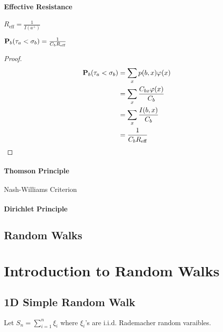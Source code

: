 \paragraph{Effective Resistance} 
\begin{definition}
    $R_{\text{eff}}=\frac{1}{I(a^+)}$
\end{definition}

\begin{theorem}
    $\mathbf{P}_b(\tau_a<\sigma_b)=\frac{1}{C_bR_{\text{eff}}}$
\end{theorem}
\begin{proof}
    \begin{align*}
        \mathbf{P}_b(\tau_a<\sigma_b)&=\sum_x p(b,x)\varphi(x)\\
        &=\sum_x \frac{C_{bx}\varphi(x)}{C_b}\\
        &=\sum_x \frac{I(b,x)}{C_b}\\
        &=\frac{1}{C_bR_{\text{eff}}}
    \end{align*}
\end{proof}

\paragraph{Thomson Principle}
Nash-Williams Criterion



\paragraph{Dirichlet Principle}

\subsection{Random Walks}


\section{Introduction to Random Walks}
\subsection{1D Simple Random Walk}
Let $S_n=\sum_{i=1}^{n}\xi_i$ where $\xi_i$'s are i.i.d. Rademacher random varaibles.
